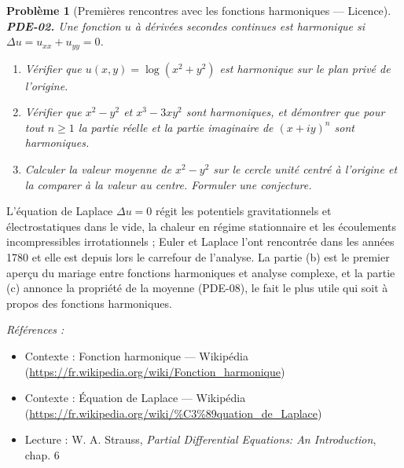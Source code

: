\documentclass[11pt]{article}
\newtheorem{problem}{Problème}
\newenvironment{refs}{\par\small\noindent\emph{Références :}\begin{itemize}\setlength\itemsep{0pt}}{\end{itemize}\normalsize}
\begin{document}
\bigskip

\begin{problem}[{Premières rencontres avec les fonctions harmoniques --- Licence}]
\textbf{PDE-02.} Une fonction $u$ à dérivées secondes continues est
\textit{harmonique} si $\Delta u = u_{xx} + u_{yy} = 0$.
\begin{enumerate}
\item[(a)] Vérifier que
$u(x,y) = \log(x^2+y^2)$ est harmonique sur le plan privé de l'origine.
\item[(b)] Vérifier
que $x^2 - y^2$ et $x^3 - 3xy^2$ sont harmoniques, et démontrer que pour tout
$n \ge 1$ la partie réelle et la partie imaginaire de $(x+iy)^n$ sont harmoniques.
\item[(c)] Calculer la valeur moyenne de $x^2 - y^2$ sur le cercle unité centré à l'origine et la
comparer à la valeur au centre. Formuler une conjecture.
\end{enumerate}

\end{problem}

\noindent L'équation de Laplace $\Delta u = 0$ régit les potentiels gravitationnels et
électrostatiques dans le vide, la chaleur en régime stationnaire et les écoulements
incompressibles irrotationnels ; Euler et Laplace l'ont rencontrée dans les années 1780 et elle est
depuis lors le carrefour de l'analyse. La partie (b) est le premier aperçu du mariage entre
fonctions harmoniques et analyse complexe, et la partie (c) annonce la propriété de la moyenne
(PDE-08), le fait le plus utile qui soit à propos des fonctions harmoniques.

\begin{refs}
\item Contexte : Fonction harmonique --- Wikipédia (\url{https://fr.wikipedia.org/wiki/Fonction_harmonique})
\item Contexte : Équation de Laplace --- Wikipédia (\url{https://fr.wikipedia.org/wiki/%C3%89quation_de_Laplace})
\item Lecture : W. A. Strauss, \textit{Partial Differential Equations: An Introduction}, chap. 6
\end{refs}

\bigskip
\end{document}
